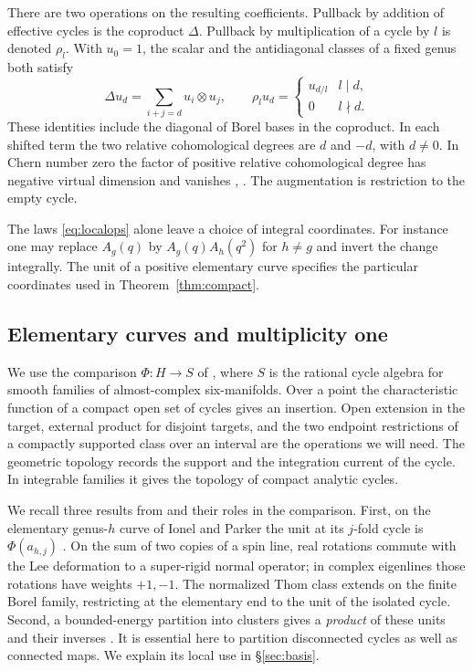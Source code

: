 There are two operations on the resulting coefficients. Pullback by
addition of effective cycles is the coproduct $\Delta$. Pullback by
multiplication of a cycle by $l$ is denoted $\rho_l$. With $u_0=1$, the
scalar and the antidiagonal classes of a fixed genus both satisfy
\begin{equation}\label{eq:localops}
 \Delta u_d=\sum_{i+j=d}u_i\otimes u_j,\qquad
 \rho_l u_d=\begin{cases}u_{d/l}&l\mid d,\\0&l\nmid d.\end{cases}
\end{equation}
These identities include the diagonal of Borel bases in the coproduct.
In each shifted term the two relative cohomological degrees are $d$
and $-d$, with $d\ne0$. In Chern number zero the factor of positive
relative cohomological degree has negative virtual dimension and vanishes
\cite[Lemma~4.13 and Theorem~6.13]{Pardon},
\cite[Proposition~3.1]{WueBalanced}. The augmentation is restriction to the
empty cycle.

The laws \eqref{eq:localops} alone leave a choice of integral
coordinates. For instance one may replace $A_g(q)$ by
$A_g(q)A_h(q^2)$ for $h\ne g$ and invert the change integrally.
The unit of a positive elementary curve specifies the particular
coordinates used in Theorem~\ref{thm:compact}.

\subsection{Elementary curves and multiplicity one}
We use the comparison $\Phi:H\to S$ of \cite[\S2]{WueProduct}, where $S$
is the rational cycle algebra for smooth families of almost-complex
six-manifolds. Over a point the characteristic function of a compact
open set of cycles gives an insertion. Open extension in the target,
external product for disjoint targets, and the two endpoint restrictions
of a compactly supported class over an interval are the operations we
will need. The geometric topology records the support and the integration
current of the cycle. In integrable families it gives the topology of
compact analytic cycles.

We recall three results from \cite{WueProduct} and their roles in the
comparison. First, on the elementary genus-$h$ curve of Ionel and Parker
the unit at its $j$-fold cycle is $\Phi(a_{h,j})$
\cite[Proposition~3.1]{WueProduct}. On the sum of two copies of a spin line,
real rotations commute with the Lee deformation to a super-rigid normal
operator; in complex eigenlines those rotations have weights $+1,-1$.
The normalized Thom class extends on the finite Borel family, restricting
at the elementary end to the unit of the isolated cycle. Second,
a bounded-energy partition into clusters gives a \emph{product} of these
units and their inverses \cite[\S4, Proposition~4.1]{WueProduct}. It is
essential here to partition disconnected cycles as well as connected
maps. We explain its local use in \S\ref{sec:basis}.

